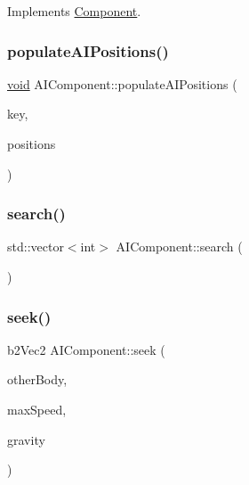 Implements \hyperlink{classComponent_a2b198f27162a6caf63917e304295f892}{Component}.

\mbox{\label{classAIComponent_a33f4903d01350f4c17e6275dbf3f9097}} 
\subsubsection{\texorpdfstring{populate\+A\+I\+Positions()}{populateAIPositions()}}
{\footnotesize\ttfamily \hyperlink{imgui__impl__opengl3__loader_8h_ac668e7cffd9e2e9cfee428b9b2f34fa7}{void} A\+I\+Component\+::populate\+A\+I\+Positions (\begin{DoxyParamCaption}\item[{char}]{key,  }\item[{b2\+Vec2}]{positions }\end{DoxyParamCaption})\hspace{0.3cm}{\ttfamily [inline]}}

\mbox{\label{classAIComponent_a81d6ead52253301578f5e25527075899}} 
\subsubsection{\texorpdfstring{search()}{search()}}
{\footnotesize\ttfamily std\+::vector$<$int$>$ A\+I\+Component\+::search (\begin{DoxyParamCaption}{ }\end{DoxyParamCaption})\hspace{0.3cm}{\ttfamily [inline]}}

\mbox{\label{classAIComponent_a356b7fa667e4aed3fdf790a58916c3b9}} 
\subsubsection{\texorpdfstring{seek()}{seek()}}
{\footnotesize\ttfamily b2\+Vec2 A\+I\+Component\+::seek (\begin{DoxyParamCaption}\item[{b2\+Body $\ast$}]{other\+Body,  }\item[{float}]{max\+Speed,  }\item[{float}]{gravity }\end{DoxyParamCaption})}

